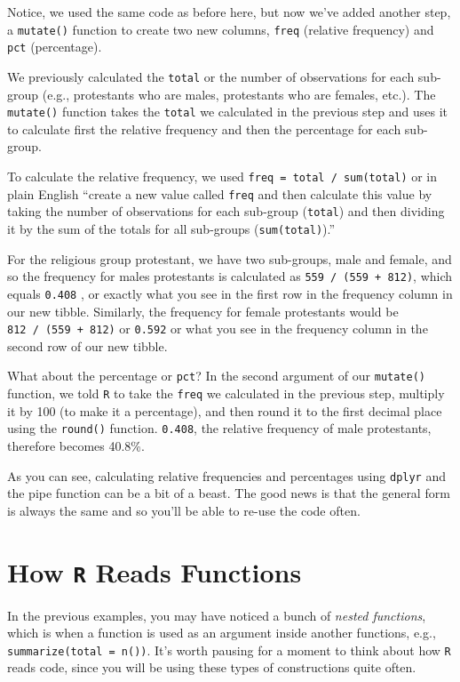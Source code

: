 \documentclass[
]{book}
\begin{document}
Notice, we used the same code as before here, but now we've added another step, a \texttt{mutate()} function to create two new columns, \texttt{freq} (relative frequency) and \texttt{pct} (percentage).

We previously calculated the \texttt{total} or the number of observations for each sub-group (e.g., protestants who are males, protestants who are females, etc.). The \texttt{mutate()} function takes the \texttt{total} we calculated in the previous step and uses it to calculate first the relative frequency and then the percentage for each sub-group.

To calculate the relative frequency, we used \texttt{freq\ =\ total\ /\ sum(total)} or in plain English ``create a new value called \texttt{freq} and then calculate this value by taking the number of observations for each sub-group (\texttt{total}) and then dividing it by the sum of the totals for all sub-groups (\texttt{sum(total)}).''

For the religious group protestant, we have two sub-groups, male and female, and so the frequency for males protestants is calculated as \texttt{559\ /\ (559\ +\ 812)}, which equals \texttt{0.408} , or exactly what you see in the first row in the frequency column in our new tibble. Similarly, the frequency for female protestants would be \texttt{812\ /\ (559\ +\ 812)} or \texttt{0.592} or what you see in the frequency column in the second row of our new tibble.

What about the percentage or \texttt{pct}? In the second argument of our \texttt{mutate()} function, we told \texttt{R} to take the \texttt{freq} we calculated in the previous step, multiply it by 100 (to make it a percentage), and then round it to the first decimal place using the \texttt{round()} function. \texttt{0.408}, the relative frequency of male protestants, therefore becomes 40.8\%.

As you can see, calculating relative frequencies and percentages using \texttt{dplyr} and the pipe function can be a bit of a beast. The good news is that the general form is always the same and so you'll be able to re-use the code often.

\hypertarget{how-r-reads-functions}{%
\section{\texorpdfstring{How \texttt{R} Reads Functions}{How R Reads Functions}}\label{how-r-reads-functions}}

In the previous examples, you may have noticed a bunch of \emph{nested functions}, which is when a function is used as an argument inside another functions, e.g., \texttt{summarize(total\ =\ n())}. It's worth pausing for a moment to think about how \texttt{R} reads code, since you will be using these types of constructions quite often.
\end{document}
